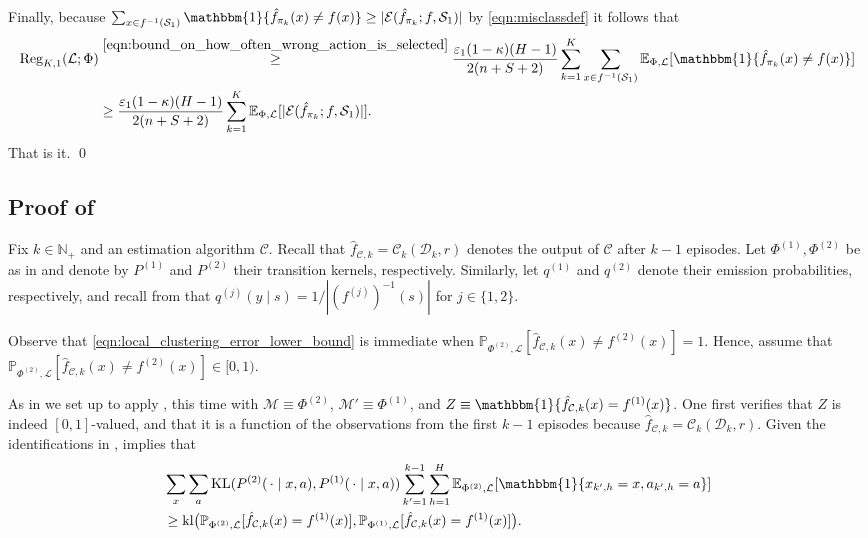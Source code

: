 \documentclass[11pt]{article}
\newcommand{\mcC}{\mathcal{C}}
\newcommand{\mcD}{\mathcal{D}}
\newcommand{\mcE}{\mathcal{E}}
\newcommand{\mcL}{\mathcal{L}}
\newcommand{\mcM}{\mathcal{M}}
\newcommand{\mcS}{\mathcal{S}}
\newcommand{\mbbP}{\mathbb{P}}
\newcommand{\mbbE}{\mathbb{E}}
\newcommand{\mbbN}{\mathbb{N}}
\newcommand{\kl}{\textnormal{kl}}
\newcommand{\KL}{\textnormal{KL}}
\newcommand{\reg}{\textnormal{Reg}}
\theoremstyle{definition}
\theoremstyle{definition}
\begin{document}
Finally, because $\sum_{x\in f^{-1}(\mcS_1)}\mathbbm{1}\{\hat{f}_{\pi_k}(x)\neq f(x)\} \geq |\mcE(\hat{f}_{\pi_k};f,\mcS_1)|$ by \eqref{eqn:misclassdef} it follows that
\begin{align}
	\reg_{K,1}(\mcL;\Phi)
	 &
	\overset{\eqref{eqn:bound_on_how_often_wrong_action_is_selected}}{\geq}
	\frac{\varepsilon_1(1-\kappa)(H-1)}{2(n+S+2)}
	\sum_{k=1}^K
	\sum_{x\in f^{-1}(\mcS_1)}
	\mbbE_{\Phi,\mcL}[\mathbbm{1}\{\hat{f}_{\pi_k}(x)\neq f(x)\}]
	\nonumber
	\\
	 &
	\geq
	\frac{\varepsilon_1(1-\kappa)(H-1)}{2(n+S+2)}
	\sum_{k=1}^K
	\mbbE_{\Phi,\mcL}[|\mcE(\hat{f}_{\pi_k};f,\mcS_1)|]
	.
\end{align}
That is it.
\qed

\subsection{Proof of \texorpdfstring{}{local clustering error lower bound}}
\label{sec:proof_of_local_clustering_error_lower_bound}

Fix $k\in\mbbN_+$ and an estimation algorithm $\mcC$.
Recall that $\hat{f}_{\mcC,k}=\mcC_{k}(\mcD_{k},r)$ denotes the output of $\mcC$ after $k-1$ episodes.
Let $\Phi^{(1)},\Phi^{(2)}$ be as in  and denote by $P^{(1)}$ and $P^{(2)}$ their transition kernels, respectively.
Similarly, let $q^{(1)}$ and $q^{(2)}$ denote their emission probabilities, respectively, and recall from  that $q^{(j)}(y \mid s)=1/|(f^{(j)})^{-1}(s)|$ for $j\in\{1,2\}$.

Observe that \eqref{eqn:local_clustering_error_lower_bound} is immediate when $\mbbP_{\Phi^{(2)},\mcL}[\hat{f}_{\mcC,k}(x)\neq f^{(2)}(x)]=1$.
Hence, assume that $\mbbP_{\Phi^{(2)},\mcL}[\hat{f}_{\mcC,k}(x)\neq f^{(2)}(x)]\in [0,1)$.

As in  we set up to apply \cite[Lemma H.1]{NEURIPS2019_10a5ab2d}, this time with $\mcM \equiv \Phi^{(2)}$, $\mcM' \equiv \Phi^{(1)}$, and $Z \equiv \mathbbm{1}\{\hat{f}_{\mcC,k}(x)=f^{(1)}(x)\}$.
One first verifies that $Z$ is indeed $[0,1]$-valued, and that it is a function of the observations from the first $k-1$ episodes because $\hat{f}_{\mcC,k}=\mcC_{k}(\mcD_{k},r)$.
Given the identifications in , \cite[Lemma H.1]{NEURIPS2019_10a5ab2d} implies that
\begin{align}
	 &
	\sum_x
	\sum_a
	\KL(P^{(2)}(\,\cdot\mid x,a),P^{(1)}(\,\cdot\mid x,a))
	\sum_{k'=1}^{k-1}
	\sum_{h=1}^H
	\mbbE_{\Phi^{(2)},\mcL}[\mathbbm{1}\{x_{k',h}=x,a_{k',h}=a\}]
	\label{eqn:lemma_H1_applied_for_clustering}
	\\
	 &
	\geq
	\kl\bigl(\mbbP_{\Phi^{(2)},\mcL}[\hat{f}_{\mcC,k}(x)=f^{(1)}(x)],\mbbP_{\Phi^{(1)},\mcL}[\hat{f}_{\mcC,k}(x)=f^{(1)}(x)]\bigr)
	.
	\nonumber
\end{align}
\end{document}
